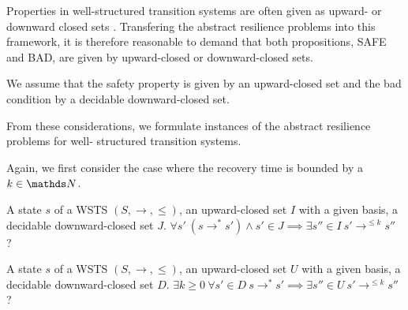 Properties in well-structured transition systems are often given as upward- or downward closed sets \cite{DBLP:journals/iandc/AbdullaCJT00, DBLP:journals/tcs/FinkelS01}.
Transfering the abstract resilience problems into this framework,
it is therefore reasonable to demand that both propositions, SAFE and BAD, are given by 
upward-closed or 
downward-closed sets.

We assume that the safety property is given by an upward-closed set and the bad condition by a decidable downward-closed set. 


From these considerations, we formulate instances of the abstract resilience problems for well-
structured transition systems.

%
%

Again, we first consider the case where the recovery time is bounded by a $k \in \N$.

{A state $s$ of a WSTS $(S,\rightarrow, \leq)$, an upward-closed set $I$ with a given basis, a decidable downward-closed set $J$.}
{$\forall s' ~ (s \rightarrow^* s') \wedge s' \in J  \implies \exists s'' \in I ~ s' \rightarrow^{\leq k} s''$ ?\newline}


{A state $s$ of a WSTS $(S,\rightarrow, \leq)$, an upward-closed set $U$ with a given basis, a decidable downward-closed set $D$.}
{$\exists k \geq 0 ~ \forall s' \in D ~ s \rightarrow^* s' \implies \exists s'' \in U ~ s' \rightarrow^{\leq k} s''$ ?\newline}

